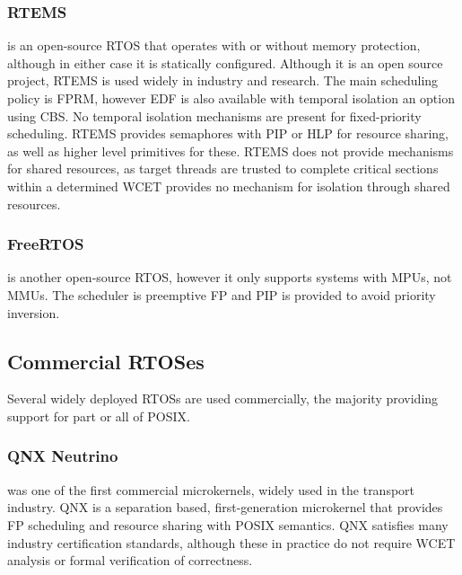 \subsubsection{RTEMS}

\citet{RTEMS:URL} is an open-source \gls{RTOS} that operates with or without
memory protection, although in either case it is statically configured.  Although it is an open
source project, RTEMS is used widely in industry and research.  The main scheduling policy is
\gls{FPRM}, however \gls{EDF} is also available with temporal isolation an option using \gls{CBS}.
No temporal isolation mechanisms are present for fixed-priority scheduling.  RTEMS provides
semaphores with \gls{PIP} or \gls{HLP} for resource sharing, as well as
higher level primitives for these. RTEMS does not provide mechanisms for shared resources, as target 
threads are trusted to complete critical sections within a determined \gls{WCET} provides no mechanism for isolation through shared resources.

\subsubsection{FreeRTOS}

\citet{FreeRTOS:URL} is another open-source \gls{RTOS}, however it only supports systems with \glspl{MPU}, not
\glspl{MMU}. The scheduler is preemptive \gls{FP} and \gls{PIP} is provided to avoid priority inversion.


\subsection{Commercial RTOSes}
Several widely deployed \glspl{RTOS} are used commercially, the majority providing support for part or
all of \gls{POSIX}.  

\subsubsection{QNX Neutrino}

\citet{QNX_10} was one of the first commercial microkernels, widely used in the transport industry.
QNX is a separation based, first-generation microkernel that provides
\gls{FP} scheduling and resource sharing with POSIX semantics.  QNX satisfies many industry
certification standards, although these in practice do not require {\gls{WCET}} analysis or formal
verification of correctness. 

